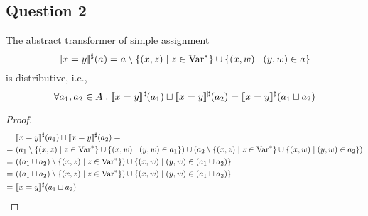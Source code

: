 \subsection{Question 2}
The abstract transformer of simple assignment
\begin{equation*}
	[\![x=y]\!]^\sharp(a) = a \setminus \{(x,z) \mid z\in \text{Var}^*\}\cup\{(x,w)\mid(y,w)\in a\}
\end{equation*}
is distributive, i.e.,
\begin{equation*}
	\forall a_1,a_2\in A: [\![x=y]\!]^\sharp(a_1)\sqcup[\![x=y]\!]^\sharp(a_2)=[\![x=y]\!]^\sharp(a_1\sqcup a_2)
\end{equation*}
\begin{proof}
\begin{align*}
 & [\![x=y]\!]^\sharp(a_1)\sqcup[\![x=y]\!]^\sharp(a_2) = \\
= \ &(a_1 \setminus \{(x,z)\mid z \in \text{Var}^*\}\cup \{(x,w)\mid(y,w)\in a_1\}) \cup (a_2 \setminus \{(x,z)\mid z \in \text{Var}^*\}\cup \{(x,w)\mid(y,w)\in a_2\}) \\
= \ &((a_1 \cup a_2) \setminus \{(x,z)\mid z \in \text{Var}^*\}) \cup \{(x,w)\mid (y,w) \in (a_1 \cup a_2)\} \\
= \ &((a_1 \sqcup a_2) \setminus \{(x,z)\mid z \in \text{Var}^*\}) \cup \{(x,w)\mid (y,w) \in (a_1 \sqcup a_2)\} \\
= \ &[\![x=y]\!]^\sharp(a_1 \sqcup a_2)
\end{align*}
\end{proof}